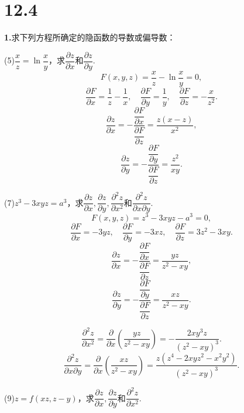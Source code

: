 \documentclass[12pt, a4paper]{article}
\begin{document}
\section*{12.4}
\textbf{1.}求下列方程所确定的隐函数的导数或偏导数：

(5)\(\dfrac{x}{z} = \ln\dfrac{x}{y}\)，求\(\dfrac{\partial z}{\partial x}\)和\(\dfrac{\partial z}{\partial y}\).
\[F(x, y, z) = \frac{x}{z} - \ln\frac{x}{y} = 0,\]
\[\frac{\partial F}{\partial x} = \frac{1}{z} - \frac{1}{x}, \quad \frac{\partial F}{\partial y} = \frac{1}{y}, \quad \frac{\partial F}{\partial z} = -\frac{x}{z^2}.\]
\[\frac{\partial z}{\partial x} = -\frac{\dfrac{\partial F}{\partial x}}{\dfrac{\partial F}{\partial z}} = \frac{z(x - z)}{x^2},\]
\[\frac{\partial z}{\partial y} = -\frac{\dfrac{\partial F}{\partial y}}{\dfrac{\partial F}{\partial z}} = \frac{z^2}{xy}.\]

(7)\(z^3 - 3xyz = a^3\)，求\(\dfrac{\partial z}{\partial x}, \dfrac{\partial z}{\partial y}, \dfrac{\partial^2 z}{\partial x^2}\)和\(\dfrac{\partial^2 z}{\partial x \partial y}\).
\[F(x, y, z) = z^3 - 3xyz - a^3 = 0,\]
\[\frac{\partial F}{\partial x} = -3yz, \quad \frac{\partial F}{\partial y} = -3xz, \quad \frac{\partial F}{\partial z} = 3z^2 - 3xy.\]
\[\frac{\partial z}{\partial x} = -\frac{\dfrac{\partial F}{\partial x}}{\dfrac{\partial F}{\partial z}} = \frac{yz}{z^2 - xy},\]
\[\frac{\partial z}{\partial y} = -\frac{\dfrac{\partial F}{\partial y}}{\dfrac{\partial F}{\partial z}} = \frac{xz}{z^2 - xy}.\]

\[\frac{\partial^2 z}{\partial x^2} = \frac{\partial}{\partial x} \left( \frac{yz}{z^2 - xy} \right) = -\frac{2xy^3z}{(z^2 - xy)^3}.\]
\[\frac{\partial^2 z}{\partial x \partial y} = \frac{\partial}{\partial x} \left( \frac{xz}{z^2 - xy} \right) = \frac{z(z^4 - 2xyz^2 - x^2y^2)}{(z^2 - xy)^3}.\]

(9)\(z = f(xz, z - y)\)，求\(\dfrac{\partial z}{\partial x}, \dfrac{\partial z}{\partial y}\)和\(\dfrac{\partial^2 z}{\partial x^2}\).
\end{document}
